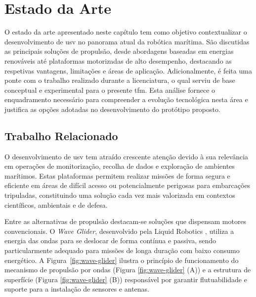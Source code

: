 
\chapter{Estado da Arte} \label{ch:estadodaarte}

O estado da arte apresentado neste capítulo tem como objetivo contextualizar o desenvolvimento de \gls{usv} no panorama atual da robótica marítima. São discutidas as principais soluções de propulsão, desde abordagens baseadas em energias renováveis até plataformas motorizadas de alto desempenho, destacando as respetivas vantagens, limitações e áreas de aplicação. Adicionalmente, é feita uma ponte com o trabalho realizado durante a licenciatura, o qual serviu de base conceptual e experimental para o presente \gls{tfm}. Esta análise fornece o enquadramento necessário para compreender a evolução tecnológica nesta área e justifica as opções adotadas no desenvolvimento do protótipo proposto.

\section{Trabalho Relacionado} 
\label{sec:trabalhorelacionado}

O desenvolvimento de \gls{usv} tem atraído crescente atenção devido à sua relevância em operações de monitorização, recolha de dados e exploração de ambientes marítimos. Estas plataformas permitem realizar missões de forma segura e eficiente em áreas de difícil acesso ou potencialmente perigosas para embarcações tripuladas, constituindo uma solução cada vez mais valorizada em contextos científicos, ambientais e de defesa.  

Entre as alternativas de propulsão destacam-se soluções que dispensam motores convencionais. O \emph{Wave Glider}, desenvolvido pela Liquid Robotics \cite{wave-glider}, utiliza a energia das ondas para se deslocar de forma contínua e passiva, sendo particularmente adequado para missões de longa duração com baixo consumo energético. A Figura~\ref{fig:wave-glider} ilustra o princípio de funcionamento do mecanismo de propulsão por ondas (Figura \ref{fig:wave-glider} (A)) e a estrutura de superfície (Figura \ref{fig:wave-glider} (B)) responsável por garantir flutuabilidade e suporte para a instalação de sensores e antenas.

